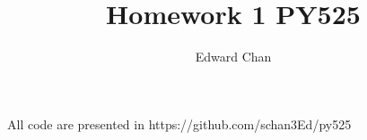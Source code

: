 \documentclass[a4paper]{article}
\title{Homework 1 PY525}
\author{Edward Chan}
\begin{document}
    
    \maketitle

    All code are presented in https://github.com/schan3Ed/py525

    

    
\end{document}
